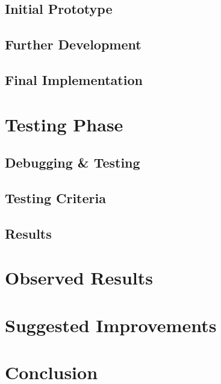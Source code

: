 \documentclass{article}
\begin{document}
\subsection{Initial Prototype}
\subsection{Further Development}
\subsection{Final Implementation}

\newpage
\section{Testing Phase}
\subsection{Debugging \& Testing}
\subsection{Testing Criteria}
\subsection{Results}

\newpage
\section{Observed Results}

\newpage
\section{Suggested Improvements}

\newpage
\section{Conclusion}

\newpage


\end{document}
